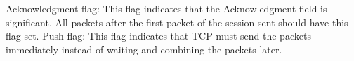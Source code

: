 Acknowledgment flag: This flag indicates that the Acknowledgment field is significant. All packets after the first packet of the session sent should have this flag set.
Push flag: This flag indicates that TCP must send the packets immediately instead of waiting and combining the packets later.